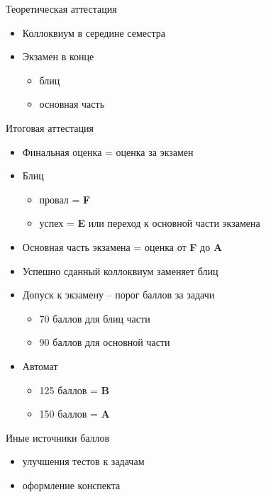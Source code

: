 \documentclass[unknownkeysallowed,xcolor=table]{beamer}
\begin{document}
\begin{frame}{Теоретическая аттестация}
  \begin{itemize}
    \item Коллоквиум в середине семестра \vspace{2em}
    \item Экзамен в конце \vspace{0.5em}
      \begin{itemize}
        \item блиц \vspace{1em}
        \item основная часть
      \end{itemize}
  \end{itemize}
\end{frame}

\begin{frame}{Итоговая аттестация}
  \begin{itemize}
    \item Финальная оценка = оценка за экзамен
    \item Блиц
      \begin{itemize}
        \item провал = \textbf{F}
        \item успех = \textbf{E} или переход к основной части экзамена
      \end{itemize}
    \item Основная часть экзамена = оценка от \textbf{F} до \textbf{A}
    \item Успешно сданный коллоквиум заменяет блиц
    \item Допуск к экзамену -- порог баллов за задачи
      \begin{itemize}
        \item 70 баллов для блиц части
        \item 90 баллов для основной части
      \end{itemize}
    \item Автомат
      \begin{itemize}
        \item 125 баллов = \textbf{B}
        \item 150 баллов = \textbf{A}
      \end{itemize}
  \end{itemize}
\end{frame}

\begin{frame}{Иные источники баллов}
  \begin{itemize}
    \item улучшения тестов к задачам \vspace{2em}
    \item оформление конспекта
  \end{itemize}
\end{frame}
\end{document}
